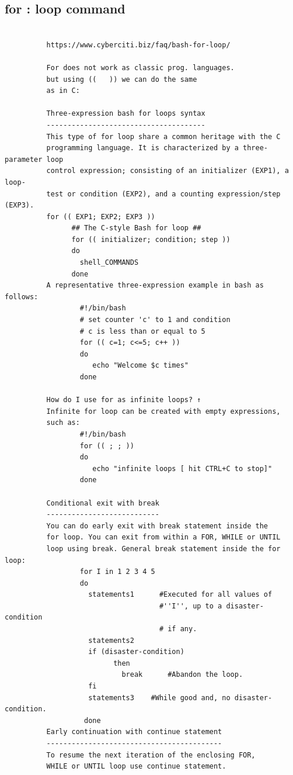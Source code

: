 \documentclass[a4paper,12pt]{article}
\begin{document}
\subsection{for   : loop command}
\begin{verbatim}
         
          https://www.cyberciti.biz/faq/bash-for-loop/
          
          For does not work as classic prog. languages.
          but using ((   )) we can do the same
          as in C:
          
          Three-expression bash for loops syntax
          --------------------------------------
          This type of for loop share a common heritage with the C       
          programming language. It is characterized by a three-parameter loop 
          control expression; consisting of an initializer (EXP1), a loop-
          test or condition (EXP2), and a counting expression/step (EXP3).
          for (( EXP1; EXP2; EXP3 ))
                ## The C-style Bash for loop ##
                for (( initializer; condition; step ))
                do
                  shell_COMMANDS
                done
          A representative three-expression example in bash as follows:
                  #!/bin/bash
                  # set counter 'c' to 1 and condition 
                  # c is less than or equal to 5
                  for (( c=1; c<=5; c++ ))
                  do  
                     echo "Welcome $c times"
                  done
          
          How do I use for as infinite loops? ↑
          Infinite for loop can be created with empty expressions, 
          such as:
                  #!/bin/bash
                  for (( ; ; ))
                  do
                     echo "infinite loops [ hit CTRL+C to stop]"
                  done
          
          Conditional exit with break 
          ---------------------------
          You can do early exit with break statement inside the
          for loop. You can exit from within a FOR, WHILE or UNTIL
          loop using break. General break statement inside the for loop:
                  for I in 1 2 3 4 5
                  do
                    statements1      #Executed for all values of 
                                     #''I'', up to a disaster-condition
                                     # if any.
                    statements2
                    if (disaster-condition)
                          then
	                        break      #Abandon the loop.
                    fi
                    statements3    #While good and, no disaster-condition.
                   done
          Early continuation with continue statement
          ------------------------------------------ 
          To resume the next iteration of the enclosing FOR, 
          WHILE or UNTIL loop use continue statement.


\end{verbatim}
\end{document}
